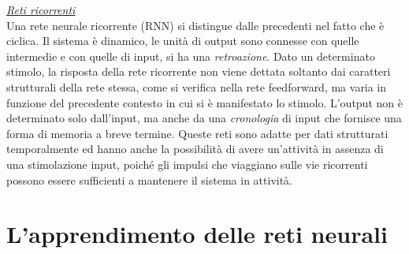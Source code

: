 \documentclass[12pt,a4paper,oneside]{book}
\begin{document}
		\underline{\emph{Reti ricorrenti}}\\
		Una rete neurale ricorrente (RNN) si distingue dalle precedenti nel fatto che è ciclica. Il sistema è dinamico, le unità di output sono connesse con quelle intermedie e con quelle di input, si ha una \emph{retroazione}. Dato un determinato stimolo, la risposta della rete ricorrente non viene dettata soltanto dai caratteri strutturali della rete stessa, come si verifica nella rete feedforward, ma varia in funzione del precedente contesto in cui si è manifestato lo stimolo. L'output non è determinato solo dall'input, ma anche da una \emph{cronologia} di input che fornisce una forma di memoria a breve termine. Queste reti sono adatte per dati strutturati temporalmente ed hanno anche la possibilità di avere un’attività in assenza di una stimolazione input, poiché gli impulsi che viaggiano sulle vie ricorrenti possono essere sufficienti a mantenere il sistema in attività.
	
	
	\chapter{L'apprendimento delle reti neurali}
	
	
	
\end{document}
